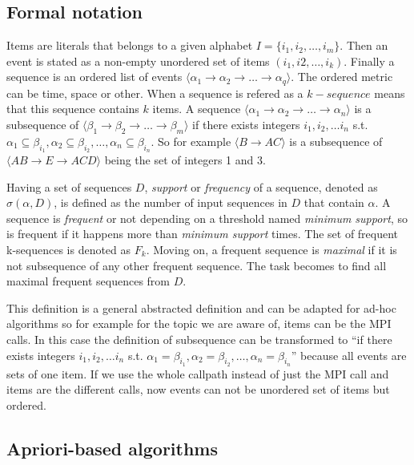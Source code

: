 \subsection{Formal notation}

Items are literals that belongs to a given alphabet $I=\{i_{1}, i_{2}, \dots,
i_{m}\}$. Then an event is stated as a non-empty unordered set of items
$(i_{1}, i{2}, \dots, i_{k})$. Finally a sequence is an ordered list of
events $\langle\alpha_{1} \rightarrow \alpha_{2} \rightarrow \dots \rightarrow
\alpha_{q}\rangle$. The ordered metric can be time, space or other. When a
sequence is refered as a $k-sequence$ means that this sequence contains $k$
items. A sequence $\langle\alpha_{1} \rightarrow \alpha_{2} \rightarrow \dots 
\rightarrow \alpha_{n}\rangle$ is a subsequence of $\langle\beta_{1} \rightarrow 
\beta_{2} \rightarrow \dots \rightarrow \beta_{m}\rangle$ if there exists
integers $i_{1}, i_{2}, \dots i_{n}$ s.t. $\alpha_{1} \subseteq \beta_{i_{1}}, 
\alpha_{2} \subseteq \beta_{i_{2}}, \dots, \alpha_{n} \subseteq \beta_{i_{n}}$.
So for example $\langle B \rightarrow AC\rangle$ is a subsequence of 
$\langle AB \rightarrow E \rightarrow ACD \rangle$ being the set of integers 1
and 3.

Having a set of sequences $D$, {\it support} or {\it frequency} of a sequence,
denoted as $\sigma(\alpha, D)$, is defined as the number of input sequences in $D$
that contain $\alpha$. A sequence is {\it frequent} or not depending on a
threshold named {\it minimum support}, so is frequent if it happens more than
{\it minimum support} times. The set of frequent k-sequences is denoted as
$F_{k}$. Moving on, a frequent sequence is {\it maximal} if it is not subsequence
of any other frequent sequence. The task becomes to find all maximal frequent
sequences from $D$.

This definition is a general abstracted definition and can be adapted for
ad-hoc algorithms so for example for the topic we are aware of, items can be the
MPI calls. In this case the
definition of subsequence can be transformed to “if there exists integers 
$i_{1}, i_{2}, \dots i_{n}$ s.t. $\alpha_{1} = \beta_{i_{1}}, 
\alpha_{2} = \beta_{i_{2}}, \dots, \alpha_{n} = \beta_{i_{n}}$” because all
events are sets of one item. If we use the whole callpath instead of just the
MPI call and items are the different calls, now events can not be unordered set
of items but ordered. 

\subsection{Apriori-based algorithms}

